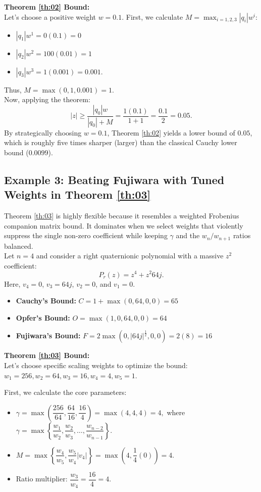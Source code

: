 \documentclass [12pt]{article}
\begin{document}
\vspace{0.3cm}
\noindent \textbf{Theorem \ref{th:02} Bound:}\\
Let's choose a positive weight $w = 0.1$. 
First, we calculate $M = \max_{i=1,2,3} |q_i|w^i$:
\begin{itemize}
	\item $|q_1|w^1 = 0(0.1) = 0$
	\item $|q_2|w^2 = 100(0.01) = 1$
	\item $|q_3|w^3 = 1(0.001) = 0.001.$
\end{itemize}
Thus, $M = \max(0, 1, 0.001) = 1$.\\
Now, applying the theorem:
\[ |z| \ge \frac{|q_{0}|w}{|q_{0}| + M} = \frac{1(0.1)}{1 + 1} = \frac{0.1}{2} = 0.05. \]
By strategically choosing $w=0.1$, Theorem \ref{th:02} yields a lower bound of \textbf{$0.05$}, which is roughly five times sharper (larger) than the classical Cauchy lower bound ($0.0099$).

\subsection*{Example 3: Beating Fujiwara with Tuned Weights in Theorem \ref{th:03}}

Theorem \ref{th:03} is highly flexible because it resembles a weighted Frobenius companion matrix bound. It dominates when we select weights that violently suppress the single non-zero coefficient while keeping $\gamma$ and the $w_n/w_{n+1}$ ratios balanced.\\
Let $n=4$ and consider a right quaternionic polynomial with a massive $z^2$ coefficient:
\[ P_{r}(z) = z^{4} + z^{2}64j. \]
Here, $v_4 = 0$, $v_3 = 64j$, $v_2 = 0$, and $v_1 = 0$.
\begin{itemize}
	\item \textbf{Cauchy's Bound:} $C = 1 + \max(0, 64, 0, 0) = 65$
	\item \textbf{Opfer's Bound:} $O=\max(1,0, 64, 0, 0) = 64$
	\item \textbf{Fujiwara's Bound:} $F = 2 \max(0, |64j|^{\frac{1}{2}}, 0, 0) = 2(8) = 16$
\end{itemize}

\noindent \textbf{Theorem \ref{th:03} Bound:}\\
Let's choose specific scaling weights to optimize the bound: $w_1 = 256, w_2 = 64, w_3 = 16, w_4 = 4, w_5 = 1$. 

\noindent First, we calculate the core parameters:
\begin{itemize}
	\item $\gamma = \max\left(\dfrac{256}{64}, \dfrac{64}{16}, \dfrac{16}{4}\right) = \max(4, 4, 4) = 4,$ where $\gamma=\max\left\{\dfrac{w_{1}}{w_{2}} ,  \dfrac{w_{2}}{w_{3}},\dots,\dfrac{w_{n-2}}{w_{n-1}}           \right\}.$
	\item $M = \max\left\{ \dfrac{w_4}{w_5}, \dfrac{w_5}{w_4}|v_4| \right\} = \max\left( 4, \dfrac{1}{4}(0) \right) = 4.$
	\item Ratio multiplier: $\dfrac{w_3}{w_4} = \dfrac{16}{4} = 4.$
\end{itemize}
\end{document}
